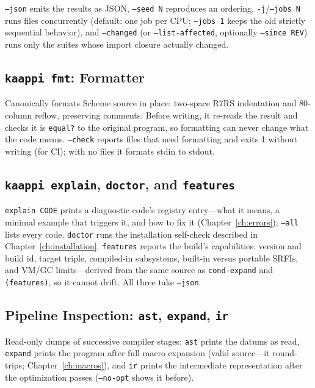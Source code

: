 \texttt{--json} emits the results as JSON, \texttt{--seed N} reproduces an ordering, \texttt{-j}/\texttt{--jobs N} runs files concurrently (default: one job per CPU; \texttt{--jobs 1} keeps the old strictly sequential behavior), and \texttt{--changed} (or \texttt{--list-affected}, optionally \texttt{--since REV}) runs only the suites whose import closure actually changed.

\subsection{\texttt{kaappi fmt}: Formatter}

Canonically formats Scheme source in place: two-space R7RS indentation and 80-column reflow, preserving comments. Before writing, it re-reads the result and checks it is \texttt{equal?} to the original program, so formatting can never change what the code means. \texttt{--check} reports files that need formatting and exits 1 without writing (for CI); with no files it formats stdin to stdout.

\subsection{\texttt{kaappi explain}, \texttt{doctor}, and \texttt{features}}

\texttt{explain CODE} prints a diagnostic code's registry entry---what it means, a minimal example that triggers it, and how to fix it (Chapter~\ref{ch:errors}); \texttt{--all} lists every code. \texttt{doctor} runs the installation self-check described in Chapter~\ref{ch:installation}. \texttt{features} reports the build's capabilities: version and build id, target triple, compiled-in subsystems, built-in versus portable SRFIs, and VM/GC limits---derived from the same source as \texttt{cond-expand} and \texttt{(features)}, so it cannot drift. All three take \texttt{--json}.

\subsection{Pipeline Inspection: \texttt{ast}, \texttt{expand}, \texttt{ir}}

Read-only dumps of successive compiler stages: \texttt{ast} prints the datums as read, \texttt{expand} prints the program after full macro expansion (valid source---it round-trips; Chapter~\ref{ch:macros}), and \texttt{ir} prints the intermediate representation after the optimization passes (\texttt{--no-opt} shows it before).

